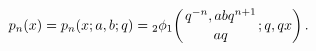 \[p_{n}(x)=\mathop{p_{n}\/}\nolimits\!\left(x;a,b;q\right)=\mathop{{{}_{2}\phi_{%
1}}\/}\nolimits\!\left({q^{-n},abq^{n+1}\atop aq};q,qx\right).\]